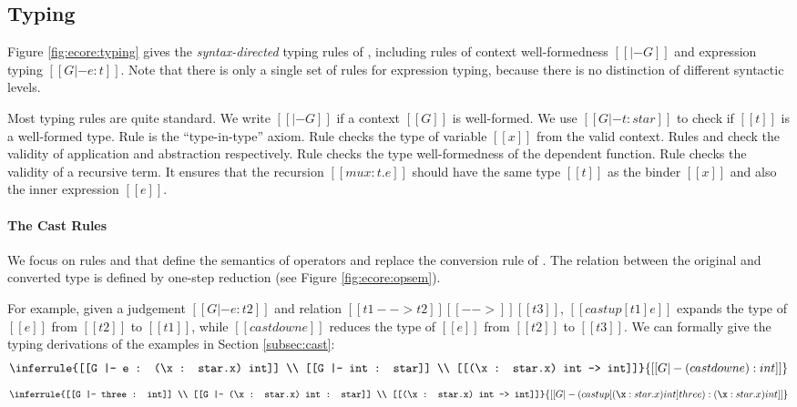 \subsection{Typing}\label{sec:ecore:type}

Figure \ref{fig:ecore:typing} gives the \emph{syntax-directed} typing
rules of \name, including rules of context well-formedness $[[|- G]]$
and expression typing $[[G |- e : t]]$. Note that there is only a
single set of rules for expression typing, because there is no
distinction of different syntactic levels.

Most typing rules are quite standard. We write $[[|- G]]$ if a context
$[[G]]$ is well-formed. We use $[[G |- t : star]]$ to check if $[[t]]$ is a
well-formed type. Rule  is the ``type-in-type''
axiom. Rule  checks the type of variable $[[x]]$ from
the valid context. Rules  and  check
the validity of application and abstraction respectively. Rule 
checks the type well-formedness of the dependent function. Rule
 checks the validity of a
recursive term. It ensures that the 
recursion $[[mu x:t.e]]$ should have the same type $[[t]]$ as the
binder $[[x]]$ and also the inner expression $[[e]]$.

\paragraph{The Cast Rules}
We focus on rules  and  that
define the semantics of \cast operators and replace the conversion
rule of \cc. The relation between the original
and converted type is defined by one-step reduction (see Figure
\ref{fig:ecore:opsem}). 

For example, given a judgement
$[[G |- e : t2]]$ and relation $[[t1 --> t2]] [[-->]] [[t3]]$,
$[[castup [t1] e]]$ expands the type of $[[e]]$ from $[[t2]]$ to
$[[t1]]$, while $[[castdown e]]$ reduces the type of $[[e]]$ from
$[[t2]]$ to $[[t3]]$. We can formally give the typing derivations of 
the examples in Section \ref{subsec:cast}:
{
\small
\[
\inferrule{[[G |- e : (\x : star.x) int]] \\ [[G |- int : star]] \\ [[(\x :
star.x) int --> int]]}{[[G |- (castdown e):int]]}
\]
\[
\inferrule{[[G |- three : int]] \\ [[G |- (\x : star.x) int : star]] \\ [[(\x :
star.x) int --> int]]}{[[G |- (castup[(\x : star.x) int] three):(\x : star.x)
int]]}
\]
}



